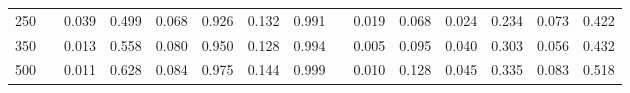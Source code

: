 % 
\begin{tabular}{ccccccccccccccc}
  \hline
  \hline
250 &  & 0.039 & 0.499 & 0.068 & 0.926 & 0.132 & 0.991 &  & 0.019 & 0.068 & 0.024 & 0.234 & 0.073 & 0.422 \\ 
  350 &  & 0.013 & 0.558 & 0.080 & 0.950 & 0.128 & 0.994 &  & 0.005 & 0.095 & 0.040 & 0.303 & 0.056 & 0.432 \\ 
  500 &  & 0.011 & 0.628 & 0.084 & 0.975 & 0.144 & 0.999 &  & 0.010 & 0.128 & 0.045 & 0.335 & 0.083 & 0.518 \\ 
   \hline
\end{tabular}
